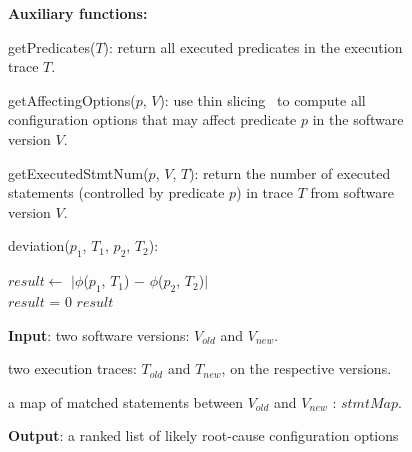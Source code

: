 
\begin{figure}[t]
\textbf{Auxiliary functions:}

getPredicates($\mathit{T}$): return all executed predicates in the execution trace $\mathit{T}$.

getAffectingOptions($\mathit{p}$, $\mathit{V}$): use thin slicing~\cite{Sridharan:2007} to compute all configuration options that may affect predicate $\mathit{p}$ in the software version $\mathit{V}$. 

getExecutedStmtNum($\mathit{p}$, $\mathit{V}$, $\mathit{T}$): return the number of executed statements (controlled by predicate $\mathit{p}$) in trace $\mathit{T}$ from software version $\mathit{V}$.



deviation($\mathit{p_{1}}$, $\mathit{T_1}$, $\mathit{p_{2}}$, $\mathit{T_2}$):\\
\vspace{-4mm}%
\begin{algorithmic}[1]
\STATE $\mathit{result} \leftarrow$ $|$$\phi$($\mathit{p_{1}}$, $\mathit{T_1}$) $-$ $\phi$($\mathit{p_{2}}$, $\mathit{T_2}$)$|$\\
\STATE $\mathit{result}$ = 0
\ENDIF
\RETURN $\mathit{result}$
\end{algorithmic}

\textbf{Input}: two software versions: $\mathit{V_{old}}$ and $\mathit{V_{new}}$. 

\quad two execution traces: $\mathit{T_{old}}$ and $\mathit{T_{new}}$, on the respective versions.

\quad a map of matched statements between $\mathit{V_{old}}$ and $\mathit{V_{new}}$ : $\mathit{stmtMap}$.

\textbf{Output}: {a ranked list of likely root-cause configuration options}

\vspace{1mm}


\end{figure}
